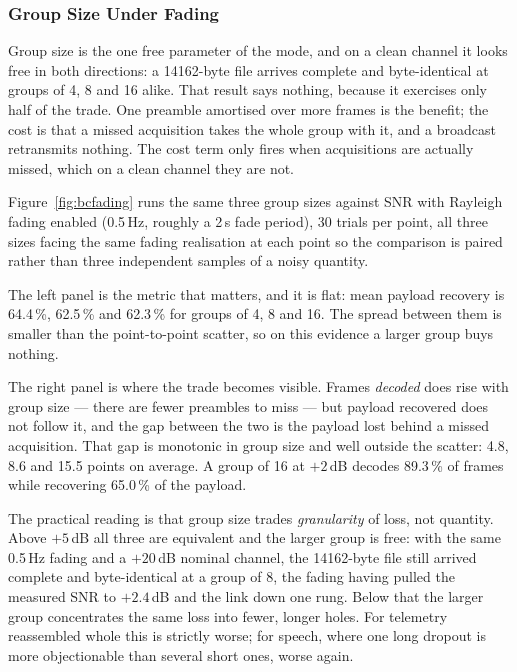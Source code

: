 \subsubsection{Group Size Under Fading}
\label{sec:bcgroup}

Group size is the one free parameter of the mode, and on a clean
channel it looks free in both directions: a 14162-byte file arrives
complete and byte-identical at groups of 4, 8 and 16 alike.  That
result says nothing, because it exercises only half of the trade.  One
preamble amortised over more frames is the benefit; the cost is that a
missed acquisition takes the whole group with it, and a broadcast
retransmits nothing.  The cost term only fires when acquisitions are
actually missed, which on a clean channel they are not.

Figure~\ref{fig:bcfading} runs the same three group sizes against SNR
with Rayleigh fading enabled (0.5\,Hz, roughly a 2\,s fade period),
30 trials per point, all three sizes facing the same fading realisation
at each point so the comparison is paired rather than three independent
samples of a noisy quantity.

The left panel is the metric that matters, and it is flat: mean payload
recovery is 64.4\,\%, 62.5\,\% and 62.3\,\% for groups of 4, 8 and 16.
The spread between them is smaller than the point-to-point scatter, so
on this evidence a larger group buys nothing.

The right panel is where the trade becomes visible.  Frames
\emph{decoded} does rise with group size --- there are fewer preambles
to miss --- but payload recovered does not follow it, and the gap
between the two is the payload lost behind a missed acquisition.  That
gap is monotonic in group size and well outside the scatter: 4.8,
8.6 and 15.5 points on average.  A group of 16 at $+2$\,dB decodes
89.3\,\% of frames while recovering 65.0\,\% of the payload.

The practical reading is that group size trades \emph{granularity} of
loss, not quantity.  Above $+5$\,dB all three are equivalent and the
larger group is free: with the same 0.5\,Hz fading and a $+20$\,dB
nominal channel, the 14162-byte file still arrived complete and
byte-identical at a group of 8, the fading having pulled the measured
SNR to $+2.4$\,dB and the link down one rung.  Below that the larger
group concentrates the same loss into fewer, longer holes.  For
telemetry reassembled whole this is strictly worse; for speech, where
one long dropout is more objectionable than several short ones, worse
again.

